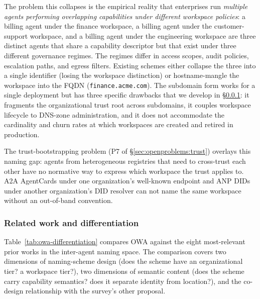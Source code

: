 The problem this collapses is the empirical reality that
enterprises run \emph{multiple agents performing
overlapping capabilities under different workspace
policies}: a billing agent under the finance workspace, a
billing agent under the customer-support workspace, and a
billing agent under the engineering workspace are three
distinct agents that share a capability descriptor but
that exist under three different governance regimes.
The regimes differ in access scopes, audit policies,
escalation paths, and egress filters.
Existing schemes either collapse the three into a single
identifier (losing the workspace distinction) or
hostname-mangle the workspace into the FQDN
(\texttt{finance.acme.com}). The subdomain form works for
a single deployment but has three specific drawbacks that
we develop in \S\ref{sec:proposals:owa:related}:
it fragments the organizational trust root across
subdomains, it couples workspace lifecycle to DNS-zone
administration, and it does not accommodate the
cardinality and churn rates at which workspaces are
created and retired in production.

The trust-bootstrapping problem (P7 of
\S\ref{sec:openproblems:trust}) overlays this naming gap:
agents from heterogeneous registries that need to
cross-trust each other have no normative way to express
which workspace the trust applies to. A2A AgentCards
under one organization's well-known endpoint and ANP DIDs
under another organization's DID resolver can not name
the same workspace without an out-of-band convention.

\subsubsection{Related work and differentiation}
\label{sec:proposals:owa:related}

Table~\ref{tab:owa-differentiation} compares OWA against
the eight most-relevant prior works in the inter-agent
naming space. The comparison covers two dimensions of
naming-scheme design (does the scheme have an
organizational tier? a workspace tier?), two dimensions
of semantic content (does the scheme carry capability
semantics? does it separate identity from location?), and
the co-design relationship with the survey's other
proposal.


